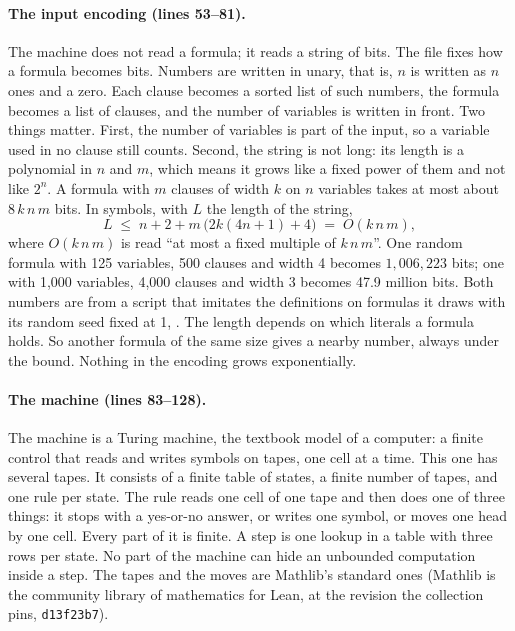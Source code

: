 \paragraph{The input encoding (lines 53--81).}
The machine does not read a formula; it reads a string of bits. The
file fixes how a formula becomes bits. Numbers are written in unary,
that is, $n$ is written as $n$ ones and a zero. Each clause becomes a
sorted list of such numbers, the formula becomes a list of clauses, and
the number of variables is written in front. Two things matter. First,
the number of variables is part of the input, so a variable used in no
clause still counts. Second, the string is not long: its length is a polynomial in $n$ and $m$, which means it grows like a fixed power of them and not like $2^n$. A formula with $m$ clauses of width $k$ on $n$ variables takes at most about $8\,k\,n\,m$ bits. In symbols, with $L$ the length of the string,
\[
  L \;\le\; n + 2 + m\,\bigl(2k(4n+1) + 4\bigr) \;=\; O(k\,n\,m),
\]
where $O(k\,n\,m)$ is read ``at most a fixed multiple of $k\,n\,m$''.
One random formula with 125 variables, 500 clauses and width 4 becomes
$1{,}006{,}223$ bits; one with 1,000 variables, 4,000 clauses and width
3 becomes 47.9 million bits. Both numbers are from a script that
imitates the definitions on formulas it draws with its random seed fixed
at 1, . The length
depends on which literals a formula holds. So another formula of the same
size gives a nearby number, always under the bound. Nothing in the
encoding grows exponentially.

\paragraph{The machine (lines 83--128).}
The machine is a Turing machine, the textbook model of a computer: a finite control that reads and writes symbols on tapes, one cell at a time. This one has several tapes. It consists of a finite table of states, a finite number of tapes, and one rule per state. The rule reads
one cell of one tape and then does one of three things: it stops with a yes-or-no answer, or
writes one symbol, or moves one head by one cell. Every part of it is
finite. A step is one lookup in a table with three rows per state. No
part of the machine can hide an unbounded computation inside a step.
The tapes and the moves are Mathlib's standard ones (Mathlib is the
community library of mathematics for Lean, at the revision the
collection pins, \texttt{d13f23b7}).

